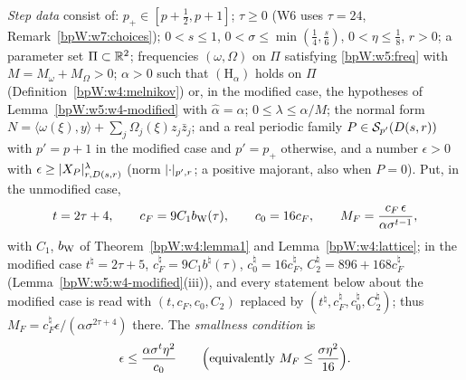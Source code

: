 \begin{definition}\label{bpW:w5:data}
\emph{Step data} consist of: $p_+\in[p+\frac12,p+1]$; $\tau\ge0$ (W6 uses $\tau=24$, Remark~\ref{bpW:w7:choices});
$0<s\le1$, $0<\sigma\le\min(\frac14,\frac s6)$, $0<\eta\le\frac18$, $r>0$; a parameter set $\Pi\subset\mathbb{R}^2$;
frequencies $(\omega,\Omega)$ on $\Pi$ satisfying \eqref{bpW:w5:freq} with $M=M_\omega+M_\Omega>0$; $\alpha>0$ such that
$(\mathrm H_\alpha)$ holds on $\Pi$ (Definition~\ref{bpW:w4:melnikov}) or, in the modified case, the hypotheses of
Lemma~\ref{bpW:w5:w4-modified} with $\hat\alpha=\alpha$; $0\le\lambda\le\alpha/M$; the normal form
$N=\langle\omega(\xi),y\rangle+\sum_j\Omega_j(\xi)z_j\bar z_j$; and a real periodic family
$P\in\mathcal S_{p'}(D(s,r))$ with $p'=p+1$ in the modified case and $p'=p_+$ otherwise, and
a number $\epsilon>0$ with $\epsilon\ge\lvert X_P\rvert^\lambda_{r,D(s,r)}$ (norm $\lvert \cdot\rvert_{p',r}$; a positive majorant, also when
$P=0$). Put, in the unmodified case,
\[t=2\tau+4,\qquad c_F=9C_1b_{\rm W}(\tau),\qquad c_0=16c_F,\qquad M_F=\frac{c_F\,\epsilon}{\alpha\sigma^{t-1}},\]
with $C_1$, $b_{\rm W}$ of Theorem~\ref{bpW:w4:lemma1} and Lemma~\ref{bpW:w4:lattice}; in the modified case
$t^\natural=2\tau+5$, $c^\natural_F=9C_1b^\natural(\tau)$, $c^\natural_0=16c^\natural_F$, $C^\natural_2=896+168c^\natural_F$
(Lemma~\ref{bpW:w5:w4-modified}(iii)), and every statement below about the modified case is read with
$(t,c_F,c_0,C_2)$ replaced by $(t^\natural,c^\natural_F,c^\natural_0,C^\natural_2)$; thus
$M_F=c^\natural_F\epsilon/(\alpha\sigma^{2\tau+4})$ there. The \emph{smallness condition}
is
\begin{equation}\label{bpW:w5:small}
\epsilon\le\frac{\alpha\sigma^t\eta^2}{c_0}\qquad\Bigl(\text{equivalently }M_F\le\frac{\sigma\eta^2}{16}\Bigr).
\end{equation}
\end{definition}

